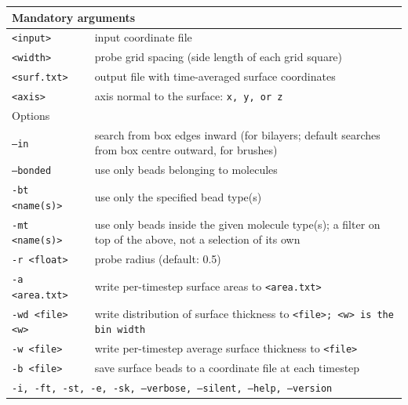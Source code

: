 \noindent
\begin{longtable}{p{}p{}}
  \toprule
  \multicolumn{2}{l}{Mandatory arguments} \\
  \midrule
  \tt{<input>}    & input coordinate file \\
  \tt{<width>}    & probe grid spacing (side length of each grid square) \\
  \tt{<surf.txt>} & output file with time-averaged surface coordinates \\
  \tt{<axis>}     & axis normal to the surface: \tt{x}, \tt{y}, or \tt{z} \\
  \toprule
  \multicolumn{2}{l}{Options} \\
  \midrule
  \tt{--in}            & search from box edges inward (for bilayers; default
                         searches from box centre outward, for brushes) \\
  \tt{--bonded}        & use only beads belonging to molecules \\
  \tt{-bt <name(s)>}   & use only the specified bead type(s) \\
  \tt{-mt <name(s)>}   & use only beads inside the given molecule type(s);
                         a filter on top of the above, not a selection of its
                         own \\
  \tt{-r <float>}      & probe radius (default: 0.5) \\
  \tt{-a <area.txt>}   & write per-timestep surface areas to \tt{<area.txt>} \\
  \tt{-wd <file> <w>}  & write distribution of surface thickness to
                         \tt{<file>}; \tt{<w>} is the bin width \\
  \tt{-w <file>}       & write per-timestep average surface thickness to
                         \tt{<file>} \\
  \tt{-b <file>}       & save surface beads to a coordinate file at each
                         timestep \\
  \midrule
  \multicolumn{2}{p{0.948\textwidth}}{\tt{-i}, \tt{-ft}, \tt{-st}, \tt{-e},
    \tt{-sk}, \tt{--verbose}, \tt{--silent}, \tt{--help}, \tt{--version}} \\
  \bottomrule
\end{longtable}

